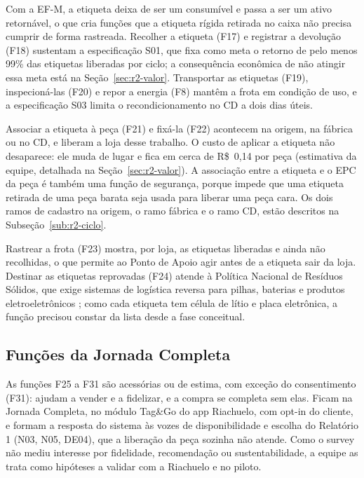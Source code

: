 Com a EF-M, a etiqueta deixa de ser um consumível e passa a ser um ativo retornável, o que cria funções que a etiqueta rígida retirada no caixa não precisa cumprir de forma rastreada. Recolher a etiqueta (F17) e registrar a devolução (F18) sustentam a especificação S01, que fixa como meta o retorno de pelo menos 99\% das etiquetas liberadas por ciclo; a consequência econômica de não atingir essa meta está na Seção~\ref{sec:r2-valor}. Transportar as etiquetas (F19), inspecioná-las (F20) e repor a energia (F8) mantêm a frota em condição de uso, e a especificação S03 limita o recondicionamento no CD a dois dias úteis.

Associar a etiqueta à peça (F21) e fixá-la (F22) acontecem na origem, na fábrica ou no CD, e liberam a loja desse trabalho. O custo de aplicar a etiqueta não desaparece: ele muda de lugar e fica em cerca de R\$~0,14 por peça (estimativa da equipe, detalhada na Seção~\ref{sec:r2-valor}). A associação entre a etiqueta e o EPC da peça é também uma função de segurança, porque impede que uma etiqueta retirada de uma peça barata seja usada para liberar uma peça cara. Os dois ramos de cadastro na origem, o ramo fábrica e o ramo CD, estão descritos na Subseção~\ref{sub:r2-ciclo}.

Rastrear a frota (F23) mostra, por loja, as etiquetas liberadas e ainda não recolhidas, o que permite ao Ponto de Apoio agir antes de a etiqueta sair da loja. Destinar as etiquetas reprovadas (F24) atende à Política Nacional de Resíduos Sólidos, que exige sistemas de logística reversa para pilhas, baterias e produtos eletroeletrônicos \cite{brasil2010pnrs}; como cada etiqueta tem célula de lítio e placa eletrônica, a função precisou constar da lista desde a fase conceitual.

\subsection{Funções da Jornada Completa}
\label{sub:r2-funcoes-jornada}

As funções F25 a F31 são acessórias ou de estima, com exceção do consentimento (F31): ajudam a vender e a fidelizar, e a compra se completa sem elas. Ficam na Jornada Completa, no módulo Tag\&Go do app Riachuelo, com opt-in do cliente, e formam a resposta do sistema às vozes de disponibilidade e escolha do Relatório 1 (N03, N05, DE04), que a liberação da peça sozinha não atende. Como o survey não mediu interesse por fidelidade, recomendação ou sustentabilidade, a equipe as trata como hipóteses a validar com a Riachuelo e no piloto.

